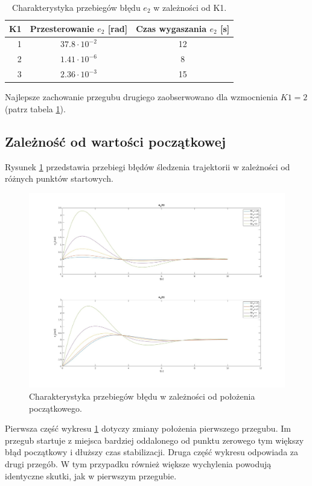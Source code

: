 \documentclass[12pt,a4paper]{article}
\begin{document}
  \begin{table}[h!]
    \centering
    \begin{tabular}{ r | c | c }
      K1 & Przesterowanie $e_2$ [rad] & Czas wygaszania $e_2$ [s]  \\ 
      \hline
      1 & $37.8 \cdot 10^{-2}$ & 12 \\
      2 & $1.41 \cdot 10^{-6}$ & 8  \\
      3 & $2.36 \cdot 10^{-3}$ & 15
    \end{tabular}
    \caption{Charakterystyka przebiegów błędu $e_2$ w zależności od K1.}
    \label{table:5}
  \end{table}

    Najlepsze zachowanie przegubu drugiego zaobserwowano dla wzmocnienia $K1=2$ (patrz tabela \ref{table:5}).


  \subsection{Zależność od wartości początkowej}

    Rysunek \ref{fig:lin3} przedstawia przebiegi błędów śledzenia trajektorii w zależności od różnych punktów startowych.

  \begin{figure}[H]
    \centering
    \includegraphics[width=1\textwidth]{figures/lin3.jpg}
    \caption{Charakterystyka przebiegów błędu w zależności od położenia początkowego.}
    \label{fig:lin3}
  \end{figure}

    Pierwsza część wykresu \ref{fig:lin3} dotyczy zmiany położenia pierwszego przegubu. Im przegub startuje z miejsca bardziej oddalonego od punktu zerowego tym większy błąd początkowy i dłuższy czas stabilizacji. Druga część wykresu odpowiada za drugi przegób. W tym przypadku również większe wychylenia powodują identyczne skutki, jak w pierwszym przegubie.
\end{document}
